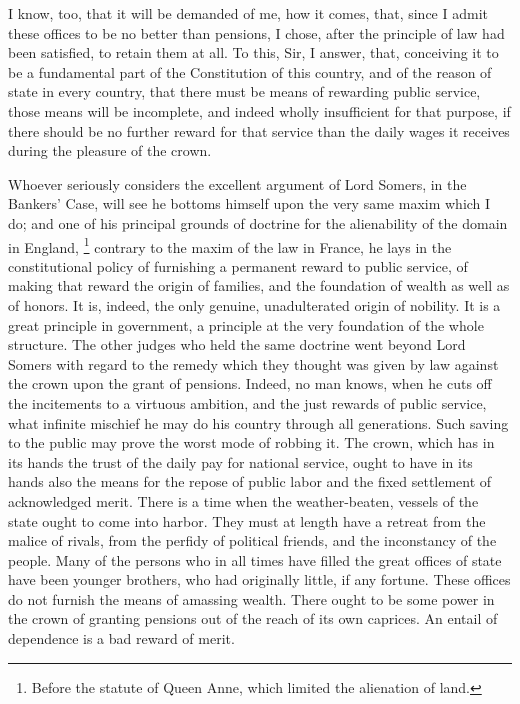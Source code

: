 I know, too, that it will be demanded of me, how it comes, that, since I admit these offices to be no better than pensions, I chose, after the principle of law had been satisfied, to retain them at all. To this, Sir, I answer, that, conceiving it to be a fundamental part of the Constitution of this country, and of the reason of state in every country, that there must be means of rewarding public service, those means will be incomplete, and indeed wholly insufficient for that purpose, if there should be no further reward for that service than the daily wages it receives during the pleasure of the crown.

Whoever seriously considers the excellent argument of Lord Somers, in the Bankers' Case, will see he bottoms himself upon the very same maxim which I do; and one of his principal grounds of doctrine for the alienability of the domain in England,
\footnote{ Before the statute of Queen Anne, which limited the alienation of land.}
 contrary to the maxim of the law in France, he lays in the constitutional policy of furnishing a permanent reward to public service, of making that reward the origin of families, and the foundation of wealth as well as of honors. It is, indeed, the only genuine, unadulterated origin of nobility. It is a great principle in government, a principle at the very foundation of the whole structure. The other judges who held the same doctrine went beyond Lord Somers with regard to the remedy which they thought was given by law against the crown upon the grant of pensions. Indeed, no man knows, when he cuts off the incitements to a virtuous ambition, and the just rewards of public service, what infinite mischief he may do his country through all generations. Such saving to the public may prove the worst mode of robbing it. The crown, which has in its hands the trust of the daily pay for national service, ought to have in its hands also the means for the repose of public labor and the fixed settlement of acknowledged merit. There is a time when the weather-beaten, vessels of the state ought to come into harbor. They must at length have a retreat from the malice of rivals, from the perfidy of political friends, and the inconstancy of the people. Many of the persons who in all times have filled the great offices of state have been younger brothers, who had originally little, if any fortune. These offices do not furnish the means of amassing wealth. There ought to be some power in the crown of granting pensions out of the reach of its own caprices. An entail of dependence is a bad reward of merit.

